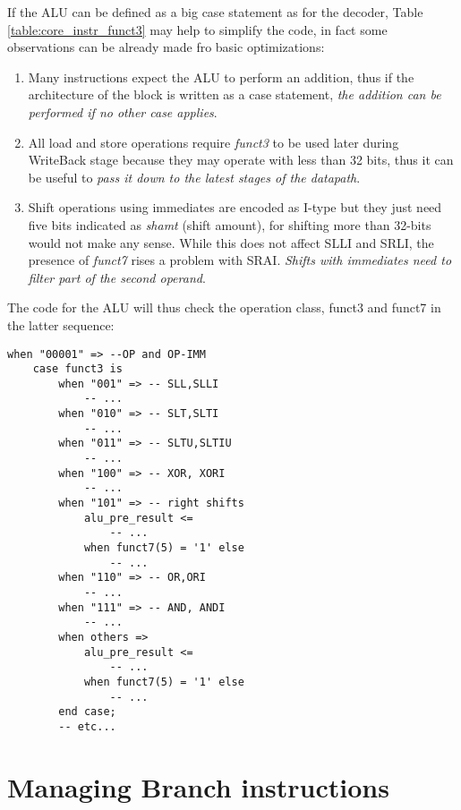 If the ALU can be defined as a big case statement as for the decoder, Table \ref{table:core_instr_funct3} may help to simplify the code, in fact some observations can be already made fro basic optimizations:
\begin{enumerate}
\item Many instructions expect the ALU to perform an addition, thus if the architecture of the block is written as a case statement, \emph{the addition can be performed if no other case applies}.
\item All load and store operations require \emph{funct3} to be used later during WriteBack stage because they may operate with less than 32 bits, thus it can be useful to \emph{pass it down to the latest stages of the datapath}.
\item Shift operations using immediates are encoded as I-type but they just need five bits indicated as \emph{shamt} (shift amount), for shifting more than 32-bits would not make any sense. While this does not affect SLLI and SRLI, the presence of \emph{funct7} rises a problem with SRAI. \emph{Shifts with immediates need to filter part of the second operand}.
\end{enumerate}
The code for the ALU will thus check the operation class, funct3 and funct7 in the latter sequence:
\begin{verbatim}
when "00001" => --OP and OP-IMM
    case funct3 is
        when "001" => -- SLL,SLLI
            -- ...
        when "010" => -- SLT,SLTI
            -- ...
        when "011" => -- SLTU,SLTIU
            -- ...
        when "100" => -- XOR, XORI
            -- ...
        when "101" => -- right shifts
            alu_pre_result <= 
                -- ...
            when funct7(5) = '1' else
                -- ...
        when "110" => -- OR,ORI
            -- ...
        when "111" => -- AND, ANDI
            -- ...
        when others =>
            alu_pre_result <= 
                -- ...
            when funct7(5) = '1' else
                -- ...
        end case;
        -- etc...
\end{verbatim}

\section{Managing Branch instructions}
\let\cleardoublepage\clearpage